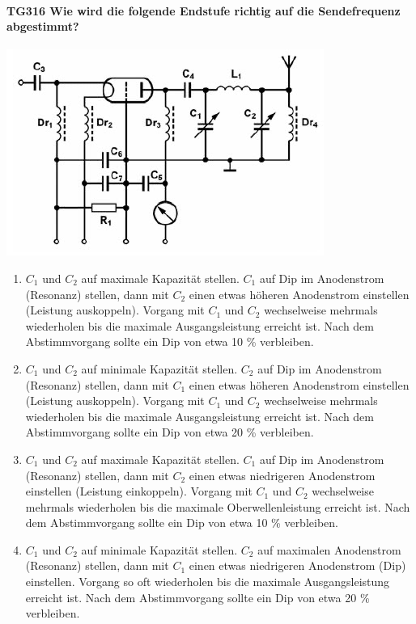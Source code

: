 \documentclass[8pt]{article}
\begin{document}
\paragraph*{TG316 Wie wird die folgende Endstufe richtig auf die Sendefrequenz abgestimmt?} 
\begin{center}
	\begin{minipage}{\linewidth}
		\centering
		\includegraphics[scale=1.0]{pics/tg316_a.jpg}
	\end{minipage}
\end{center}
\begin{enumerate}[nolistsep,label=\Alph*]
\item $C_{1}$ und $C_{2}$ auf maximale Kapazität stellen. $C_{1}$ auf Dip im Anodenstrom (Resonanz) stellen, dann mit $C_{2}$ einen etwas höheren Anodenstrom einstellen (Leistung auskoppeln). Vorgang mit $C_{1}$ und $C_{2}$ wechselweise mehrmals wiederholen bis die maximale Ausgangsleistung erreicht ist. Nach dem Abstimmvorgang sollte ein Dip von etwa 10 \% verbleiben.
\item $C_{1}$ und $C_{2}$ auf minimale Kapazität stellen. $C_{2}$ auf Dip im Anodenstrom (Resonanz) stellen, dann mit $C_{1}$ einen etwas höheren Anodenstrom einstellen (Leistung auskoppeln). Vorgang mit $C_{1}$ und $C_{2}$ wechselweise mehrmals wiederholen bis die maximale Ausgangsleistung erreicht ist. Nach dem Abstimmvorgang sollte ein Dip von etwa 20 \% verbleiben.
\item $C_{1}$ und $C_{2}$ auf maximale Kapazität stellen. $C_{1}$ auf Dip im Anodenstrom (Resonanz) stellen, dann mit $C_{2}$ einen etwas niedrigeren Anodenstrom einstellen (Leistung einkoppeln). Vorgang mit $C_{1}$ und $C_{2}$ wechselweise mehrmals wiederholen bis die maximale Oberwellenleistung erreicht ist. Nach dem Abstimmvorgang sollte ein Dip von etwa 10 \% verbleiben.
\item $C_{1}$ und $C_{2}$ auf minimale Kapazität stellen. $C_{2}$ auf maximalen Anodenstrom (Resonanz) stellen, dann mit $C_{1}$ einen etwas niedrigeren Anodenstrom (Dip) einstellen. Vorgang so oft wiederholen bis die maximale Ausgangsleistung erreicht ist. Nach dem Abstimmvorgang sollte ein Dip von etwa 20 \% verbleiben.
\end{enumerate}
\end{document}
